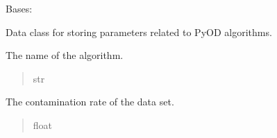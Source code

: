 \documentclass[letterpaper,10pt,english]{sphinxmanual}
\begin{document}
\begin{fulllineitems}
\label{\detokenize{application.services:application.services.PyodWrapper.PyodParameters}}
\pysigstartsignatures
{}
\pysigstopsignatures
\sphinxAtStartPar
Bases: 

\sphinxAtStartPar
Data class for storing parameters related to PyOD algorithms.

\begin{fulllineitems}
\label{\detokenize{application.services:application.services.PyodWrapper.PyodParameters.algorithm_name}}
\pysigstartsignatures
{}
\pysigstopsignatures
\sphinxAtStartPar
The name of the algorithm.
\begin{quote}\begin{description}
\sphinxAtStartPar
str

\end{description}\end{quote}

\end{fulllineitems}


\begin{fulllineitems}
\label{\detokenize{application.services:application.services.PyodWrapper.PyodParameters.contamination}}
\pysigstartsignatures
{}
\pysigstopsignatures
\sphinxAtStartPar
The contamination rate of the data set.
\begin{quote}\begin{description}
\sphinxAtStartPar
float

\end{description}\end{quote}


\end{fulllineitems}
\end{fulllineitems}
\end{document}
